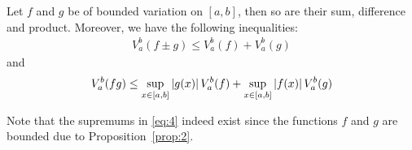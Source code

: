 \documentclass[thmcnt=section, color=blue, 12pt]{my-elegantbook}
\begin{document}
\begin{theorem} \label{thm:1}
	Let $f$ and $g$ be of bounded variation on $[a, b]$, then
	so are their sum, difference and product.
	Moreover, we have the following inequalities:
	\begin{align}
		V_a^b (f \pm g)  \leq V_a^b (f) + V_a^b (g)
		\label{eq:3}
	\end{align}
	and
	\begin{align}
		V_a^b (fg)       \leq \sup_{x \in [a, b]} \left\lvert g(x) \right\rvert V_a^b (f)
		+ \sup_{x \in [a, b]} \left\lvert f(x) \right\rvert V_a^b (g)
		\label{eq:4}
	\end{align}
\end{theorem}

\begin{note}
	Note that the supremums in \eqref{eq:4} indeed exist
	since the functions $f$ and $g$ are bounded due to Proposition~\ref{prop:2}.
\end{note}
\end{document}
